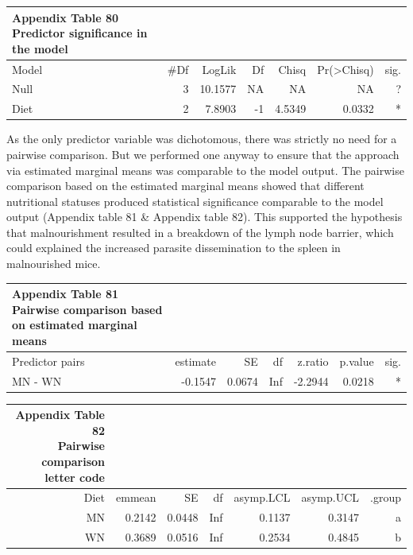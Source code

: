 \documentclass[
  12pt,
  letterpaper,
]{article}
\begin{document}
\begingroup
\fontsize{12.0pt}{14.4pt}\selectfont
\begin{longtable}{l|rrrrrr}
\caption*{
{\large \textbf{Appendix Table 80}} \\ 
{\small \textbf{Predictor significance in the model}}
} \\ 
\toprule
Model & \#Df & {LogLik} & {Df} & {Chisq} & {Pr(>Chisq)} & {sig.} \\ 
\midrule\addlinespace[2.5pt]
Null & 3 & 10.1577 & NA & NA & NA & ? \\ 
Diet & 2 & 7.8903 & -1 & 4.5349 & 0.0332 & * \\ 
\bottomrule
\end{longtable}
\endgroup

As the only predictor variable was dichotomous, there was strictly no need for a pairwise comparison. But we performed one anyway to ensure that the approach via estimated marginal means was comparable to the model output. The pairwise comparison based on the estimated marginal means showed that different nutritional statuses produced statistical significance comparable to the model output (Appendix table 81 \& Appendix table 82). This supported the hypothesis that malnourishment resulted in a breakdown of the lymph node barrier, which could explained the increased parasite dissemination to the spleen in malnourished mice.

\begingroup
\fontsize{12.0pt}{14.4pt}\selectfont
\begin{longtable}{l|rrrrrr}
\caption*{
{\large \textbf{Appendix Table 81}} \\ 
{\small \textbf{Pairwise comparison based on estimated marginal means}}
} \\ 
\toprule
Predictor pairs & {estimate} & {SE} & {df} & {z.ratio} & {p.value} & {sig.} \\ 
\midrule\addlinespace[2.5pt]
MN - WN & -0.1547 & 0.0674 & Inf & -2.2944 & 0.0218 & * \\ 
\bottomrule
\end{longtable}
\endgroup

\begingroup
\fontsize{12.0pt}{14.4pt}\selectfont
\begin{longtable}{rrrrrrr}
\caption*{
{\large \textbf{Appendix Table 82}} \\ 
{\small \textbf{Pairwise comparison letter code}}
} \\ 
\toprule
{Diet} & {emmean} & {SE} & {df} & {asymp.LCL} & {asymp.UCL} & {.group} \\ 
\midrule\addlinespace[2.5pt]
MN & 0.2142 & 0.0448 & Inf & 0.1137 & 0.3147 &  a  \\ 
WN & 0.3689 & 0.0516 & Inf & 0.2534 & 0.4845 &   b \\ 
\bottomrule
\end{longtable}
\endgroup
\end{document}
